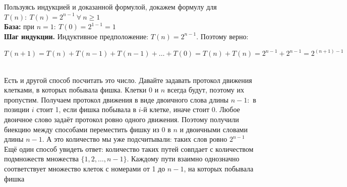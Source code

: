 \documentclass[a4paper]{article}
\begin{document}
Пользуясь индукцией и доказанной формулой, докажем формулу для $T(n):\ T(n)=2^{n-1}\ \forall\ n\geqslant1$\\[2mm]
\indent \textbf{База:} при $n=1:\ T(0)=2^{1-1}=1$\\[2mm]
\indent \textbf{Шаг индукции.} Индуктивное предположение: $T(n)=2^{n-1}$. Поэтому верно:\\[2mm]
\centerline{$T(n+1)=T(n)+T(n-1)+T(n-1)+\ldots+T(0)=T(n)+T(n)=2^{n-1}+2^{n-1}=2^{(n+1)-1}$}\\[2mm]
\indent Есть и другой способ посчитать это число. Давайте задавать протокол движения клетками, в которых побывала фишка. Клетки 0 и $n$ всегда будут, поэтому их пропустим. Получаем протокол движения в виде двоичного слова длины $n-1:$ в позиции $i$ стоит 1, если фишка побывала в $i$-й клетке, иначе стоит 0. Любое двоичное слово задаёт протокол ровно одного движения. Поэтому получили биекцию между способами переместить фишку из 0 в $n$ и двоичными словами длины $n-1$. А это количество мы уже подсчитывали: таких слов ровно $2^{n-1}$\\[2mm]
\indent Ещё один способ увидеть ответ: количество таких путей совпдает с количеством подмножеств множества $\{1, 2,\ldots, n-1\}$. Каждому пути взаимно однозначно соответствует множество клеток с номерами от 1 до $n-1$, на которых побывала
фишка
\end{document}
